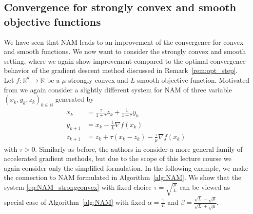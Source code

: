 \documentclass[12pt,openany]{book}
\theoremstyle{definition}
\theoremstyle{definition}
\newcommand{\N}{\mathbb{N}}
\newcommand{\R}{\mathbb{R}}
\begin{document}
\subsection{Convergence for strongly convex and smooth objective functions}

We have seen that NAM leads to an improvement of the convergence for convex and smooth functions. We now want to consider the strongly convex and smooth setting, where we again show improvement compared to the optimal convergence behavior of the gradient descent method discussed in Remark~\ref{rem:opt_step}. Let $f:\R^d\to\R$ be a $\mu$-strongly convex and $L$-smooth objective function. Motivated from \cite{Wilson2021} we again consider a slightly different system for NAM of three variable $(x_k,y_k,z_k)_{k\in\N}$ generated by
\begin{equation}\label{eq:NAM_strongconvex}
\begin{split}
x_k &= \frac{\tau}{1+\tau} z_k + \frac{1}{1+\tau} y_k\\
y_{k+1} &= x_k - \frac{1}{L}\nabla f(x_k)\\
z_{k+1} &= z_k +\tau(x_k-z_k)-\frac{\tau}{\mu}\nabla f(x_k)
\end{split}\, 
\end{equation}
with $\tau>0$. Similarly as before, the authors in \cite{Wilson2021} consider a more general family of accelerated gradient methods, but due to the scope of this lecture course we again consider only the simplified formulation. In the following example, we make the connection to NAM formulated in Algorithm~\ref{alg:NAM}. We show that the system \eqref{eq:NAM_strongconvex} with fixed choice $\tau = \sqrt{\frac{\mu}{L}}$ can be viewed as special case of Algorithm~\ref{alg:NAM} with fixed $\alpha = \frac{1}{L}$ and $\beta = \frac{\sqrt{L}-\sqrt{\mu}}{\sqrt{L}+\sqrt{\mu}}$.
\end{document}

